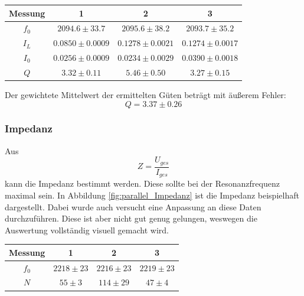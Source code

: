 \documentclass[12pt,a4paper]{article}
\begin{document}
\begin{table}
\centering
\begin{tabular}{|c|c|c|c|}
\hline
Messung & 1 & 2 & 3\\
\hline
$f_0$ & $2094.6\pm 33.7$ & $2095.6\pm 38.2$ & $2093.7\pm 35.2$\\
\hline
$I_L$ & $0.0850\pm 0.0009$ & $0.1278\pm 0.0021$ & $0.1274\pm 0.0017$ \\
\hline
$I_0$ & $0.0256\pm 0.0009$ & $0.0234\pm 0.0029$ & $0.0390\pm 0.0018$ \\
\hline
$Q$ & $3.32\pm 0.11$ & $5.46\pm 0.50$ & $3.27\pm 0.15$ \\
\hline
\end{tabular}
\label{tab:Stromhoch_Rohdaten}
\end{table}
Der gewichtete Mittelwert der ermittelten Güten beträgt mit äußerem Fehler:
\begin{equation}
Q = 3.37\pm 0.26 
\end{equation}

\subsubsection{Impedanz}
Aus
\begin{equation}
Z = \dfrac{U_{ges}}{I_{ges}}
\end{equation}
kann die Impedanz bestimmt werden. Diese sollte bei der Resonanzfrequenz maximal sein. In Abbildung \ref{fig:parallel_Impedanz} ist die Impedanz beispielhaft dargestellt. Dabei wurde auch versucht eine Anpassung an diese Daten durchzuführen. Diese ist aber nicht gut genug gelungen, weswegen die Auswertung vollständig visuell gemacht wird.\\

\begin{table}
\centering
\begin{tabular}{|c|c|c|c|}
\hline
Messung & 1 & 2 & 3\\
\hline
$f_0$ & $2218\pm 23$ & $2216\pm 23$ & $2219\pm 23$\\
\hline
$N$ & $55\pm 3$ & $114\pm 29$ & $47\pm 4$\\
\hline
\end{tabular}
\label{tab:Parallel_Impedanz}
\end{table}
\end{document}
